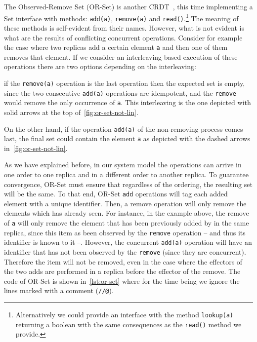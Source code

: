 The Observed-Remove Set (OR-Set) is another CRDT~\cite{ShapiroPBZ11},
this time implementing a Set interface with methods: \lstinline|add(a)|,
\lstinline|remove(a)| and \lstinline|read()|.\footnote{Alternatively
  we could provide an interface with the method \lstinline|lookup(a)|
  returning a boolean with the same consequences as the
  \lstinline|read()| method we provide.}
%
The meaning of these methods is self-evident from their names.
%
However, what is not evident is what are the results of conflicting
concurrent operations.
%
Consider for example the case where two replicas add a certain element
\lstinline|a| and then one of them removes that element.
%
If we consider an interleaving based execution of these operations
there are two options depending on the interleaving:
\begin{inparaenum}[i)]
\item if the \lstinline|remove(a)| operation is the last operation
  then the expected set is empty, since the two consecutive
  \lstinline|add(a)| operations are idempotent, and the
  \lstinline|remove| would remove the only occurrence of
  \lstinline|a|. This interleaving is the one depicted with solid
  arrows at the top of~\autoref{fig:or-set-not-lin}.
\item On the other hand, if the operation \lstinline|add(a)| of the
  non-removing process comes last, the final set could contain the
  element \lstinline|a| as depicted with the dashed arrows
  in~\autoref{fig:or-set-not-lin}.
\end{inparaenum}
As we have explained before, in our system model the operations can
arrive in one order to one replica and in a different order to another
replica.
%
To guarantee convergence, OR-Set must ensure that regardless of the
ordering, the resulting set will be the same.
%
To that end, OR-Set \lstinline|add| operations will tag each added
element with a unique identifier.
%
Then, a remove operation will only remove the elements which has
already seen.
%
For instance, in the example above, the remove of \lstinline|a| will
only remove the element that has been previously added by in the same
replica, since this item as been observed by the \lstinline|remove|
operation -- and thus its identifier is known to it --. However, the
concurrent \lstinline|add(a)| operation will have an identifier that
has not been observed by the \lstinline|remove| (since they are
concurrent).
%
Therefore the item will not be removed, even in the case where the
effectors of the two adds are performed in a replica before the effector
of the remove.
%
The code of OR-Set is shown in~\autoref{lst:or-set} where for the time
being we ignore the lines marked with a comment (\lstinline|//@|).

